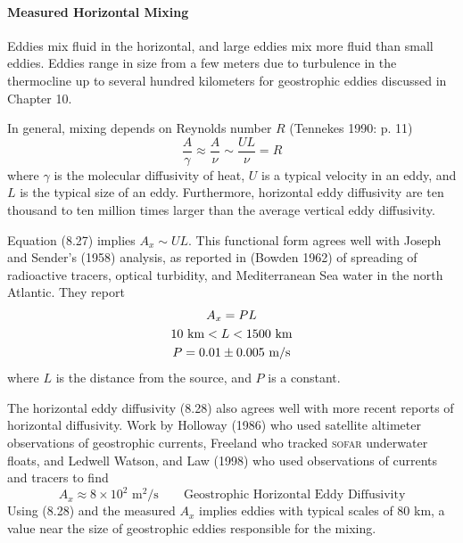 \paragraph{Measured Horizontal Mixing}
 Eddies mix fluid in the
horizontal, and large eddies mix more fluid than small eddies. Eddies
range in size from a few meters due to
turbulence in the
thermocline up to several hundred kilometers for
geostrophic eddies discussed in
Chapter 10.

In general, mixing depends on Reynolds number $R$ (Tennekes 1990:
p. 11)
\begin{equation}
\frac{A}{\gamma} \approx \frac{A}{\nu} \sim \frac{UL}{\nu} = R
\end{equation}
where $\gamma$ is the molecular diffusivity of heat, $U$ is a typical
velocity in an eddy, and $L$ is the typical size of an
eddy. Furthermore, horizontal eddy diffusivity are ten thousand to ten
million times larger than the average vertical eddy diffusivity.

Equation (8.27) implies $A_x\sim UL$. This functional form agrees well
with Joseph and Sender's (1958) analysis, as reported in (Bowden 1962)
of spreading of radioactive tracers, optical turbidity, and
Mediterranean Sea water in the north Atlantic. They report
\begin{gather}
A_x = P L \\
10 \text{ km} < L < 1500 \text{ km} \notag \\
P = 0.01 \pm 0.005 \text{ m/s} \notag
\end{gather}
where $L$ is the distance from the source, and $P$ is a constant.

The horizontal eddy diffusivity (8.28) also agrees well with more
recent reports of horizontal diffusivity. Work by Holloway (1986) who
used satellite altimeter observations of geostrophic
currents,
Freeland who tracked \textsc{sofar} underwater floats, and Ledwell
Watson, and Law (1998) who used observations of currents and tracers
to find
\begin{equation}
A_x \approx 8 \times 10^2 \text{ m$^2$/s} \qquad \text{Geostrophic Horizontal
Eddy Diffusivity}
\end{equation}
Using (8.28) and the measured $A_x$ implies eddies with typical scales
of 80 km, a value near the size of geostrophic
eddies responsible for the mixing.

